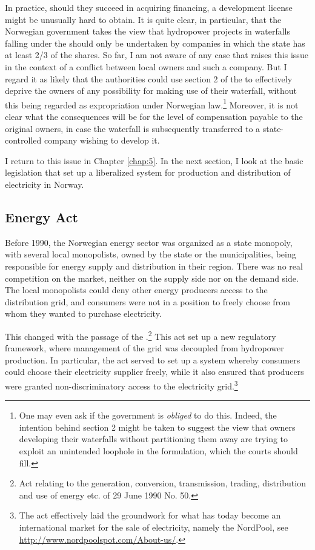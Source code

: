 In practice, should they succeed in acquiring financing, a development license might be unusually hard to obtain. It is quite clear, in particular, that the Norwegian government takes the view that hydropower projects in waterfalls falling under the \cite{ica17} should only be undertaken by companies in which the state has at least 2/3 of the shares. So far, I am not aware of any case that raises this issue in the context of a conflict between local owners and such a company. But I regard it as likely that the authorities could use section 2 of the \cite{ica17} to effectively deprive the owners of any possibility for making use of their waterfall, without this being regarded as expropriation under Norwegian law.\footnote{One may even ask if the government is {\it obliged} to do this. Indeed, the intention behind section 2 might be taken to suggest the view that owners developing their waterfalls without partitioning them away are trying to exploit an unintended loophole in the formulation, which the courts should fill.} Moreover, it is not clear what the consequences will be for the level of compensation payable to the original owners, in case the waterfall is subsequently transferred to a state-controlled company wishing to develop it. 

I return to this issue in Chapter \ref{chap:5}. In the next section, I look at the basic legislation that set up a liberalized system for production and distribution of electricity in Norway.

\subsection{Energy Act}\label{sec:ea}

Before 1990, the Norwegian energy sector was organized as a state monopoly, with several local monopolists, owned by the state or the municipalities, being responsible for energy supply and distribution in their region. There was no real competition on the market, neither on the supply side nor on the demand side. The local monopolists could deny other energy producers access to the distribution grid, and consumers were not in a position to freely choose from whom they wanted to purchase electricity.

This changed with the passage of the \cite{ea90}.\footnote{Act relating to the generation, conversion, transmission, trading, distribution and use of energy etc. of 29 June 1990 No. 50.} This act set up a new regulatory framework, where management of the grid was decoupled from hydropower production. In particular, the act served to set up a system whereby consumers could choose their electricity supplier freely, while it also ensured that producers were granted non-discriminatory access to the electricity grid.\footnote{The act effectively laid the groundwork for what has today become an international market for the sale of electricity, namely the NordPool, see \url{http://www.nordpoolspot.com/About-us/}.}

